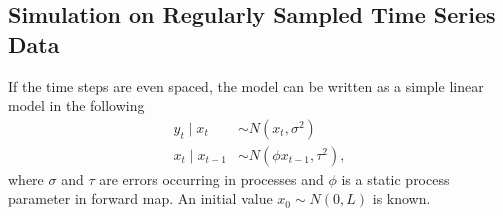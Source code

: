 

\subsection{Simulation on Regularly Sampled Time Series Data}

If the time steps are even spaced, the model can be written as a simple linear model in the following 
\begin{align*}
y_t\mid x_t      &\sim N\left(x_t,\sigma^2\right) \\
x_t\mid x_{t-1} &\sim N\left(\phi x_{t-1},\tau^2\right),
\end{align*}
where $\sigma$ and $\tau$ are \iid  errors occurring in processes and $\phi$ is a static process parameter in forward map. An initial value $x_0\sim N(0,L)$ is known. 


